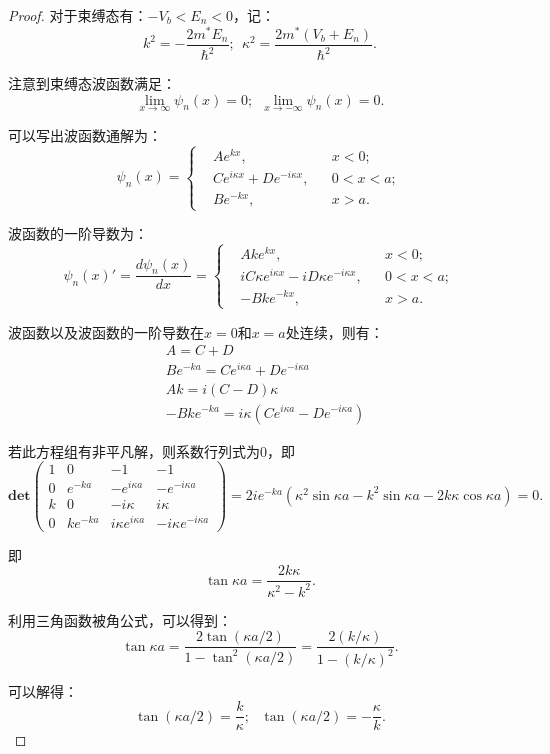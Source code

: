 \documentclass[reqno,a4paper,12pt]{amsart}
\begin{document}
\begin{enumerate}[a)]
\begin{proof}
对于束缚态有：$-V_b < E_n < 0$，记：
\[
	k^2 = -\frac{2m^*E_n}{\hbar^2}; \ \ \kappa^2 = \frac{2m^*(V_b + E_n)}{\hbar^2}.
\]

注意到束缚态波函数满足：
\[
	\lim_{x\to \infty} \psi_n(x) = 0; \ \ \lim_{x\to -\infty} \psi_n(x) = 0.
\]

可以写出波函数通解为：
\[
	\psi_n(x) = \left\{ \begin{aligned}
		&Ae^{kx},& & x<0; \\
		&Ce^{i\kappa x} + De^{-i\kappa x},& & 0<x<a; \\
		&Be^{-kx},& & x>a.
	\end{aligned} \right.
\]

波函数的一阶导数为：
\[
	\psi_n(x)' = \frac{d\psi_n(x)}{dx} = \left\{ \begin{aligned}
		&Ake^{kx},& & x<0; \\
		&iC\kappa e^{i\kappa x} - iD\kappa e^{-i\kappa x},& & 0<x<a; \\
		&-Bke^{-kx},& & x>a.
	\end{aligned} \right.
\]

波函数以及波函数的一阶导数在$x=0$和$x=a$处连续，则有：
\begin{align*}
	&A = C + D \\
	&Be^{-ka} = Ce^{i\kappa a} + De^{-i\kappa a} \\
	&Ak = i(C-D)\kappa \\
	&-Bke^{-ka} = i\kappa (Ce^{i\kappa a} - De^{-i\kappa a})
\end{align*}

若此方程组有非平凡解，则系数行列式为0，即
\[
	\mathbf{det} \left( \begin{matrix}
		1 & 0 & -1 & -1 \\
		0 & e^{-ka} & -e^{i\kappa a} & -e^{-i\kappa a} \\
		k & 0 & -i\kappa & i\kappa \\
		0 & ke^{-ka} & i\kappa e^{i\kappa a} & -i\kappa e^{-i\kappa a}
	\end{matrix} \right) = 2ie^{-ka} (\kappa^2 \sin\kappa a - k^2\sin \kappa a - 2k\kappa \cos\kappa a) = 0.
\]

即
\[
	\tan \kappa a = \frac{2k\kappa}{\kappa^2 - k^2}.
\]

利用三角函数被角公式，可以得到：
\[
	\tan \kappa a = \frac{2\tan(\kappa a/2)}{1 - \tan^2(\kappa a/2)} = \frac{2(k/\kappa)}{1-(k/\kappa)^2}.
\]

可以解得：
\[
	\tan(\kappa a/2) = \frac{k}{\kappa}; \ \ \ \tan(\kappa a/2) = -\frac{\kappa}{k}.
\]


\end{proof}
\end{enumerate}
\end{document}
